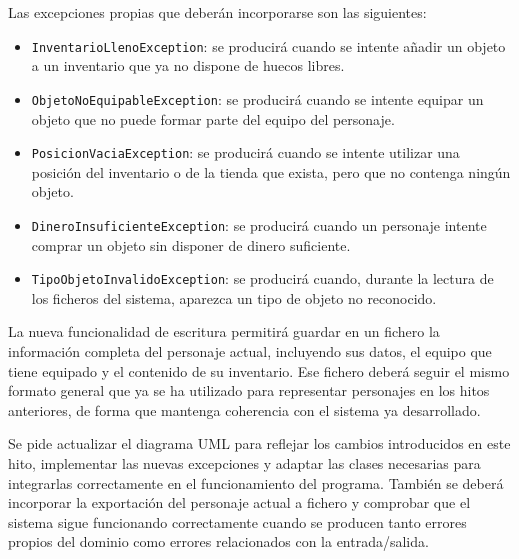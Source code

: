 \documentclass[11pt,a4paper]{article}
\begin{document}
Las excepciones propias que deberán incorporarse son las siguientes:
\begin{itemize}
    \item \texttt{InventarioLlenoException}: se producirá cuando se intente añadir un objeto a un inventario que ya no dispone de huecos libres.
    \item \texttt{ObjetoNoEquipableException}: se producirá cuando se intente equipar un objeto que no puede formar parte del equipo del personaje.
    \item \texttt{PosicionVaciaException}: se producirá cuando se intente utilizar una posición del inventario o de la tienda que exista, pero que no contenga ningún objeto.
    \item \texttt{DineroInsuficienteException}: se producirá cuando un personaje intente comprar un objeto sin disponer de dinero suficiente.
    \item \texttt{TipoObjetoInvalidoException}: se producirá cuando, durante la lectura de los ficheros del sistema, aparezca un tipo de objeto no reconocido.
\end{itemize}

La nueva funcionalidad de escritura permitirá guardar en un fichero la información completa del personaje actual, incluyendo sus datos, el equipo que tiene equipado y el contenido de su inventario. Ese fichero deberá seguir el mismo formato general que ya se ha utilizado para representar personajes en los hitos anteriores, de forma que mantenga coherencia con el sistema ya desarrollado.

Se pide actualizar el diagrama UML para reflejar los cambios introducidos en este hito, implementar las nuevas excepciones y adaptar las clases necesarias para integrarlas correctamente en el funcionamiento del programa. También se deberá incorporar la exportación del personaje actual a fichero y comprobar que el sistema sigue funcionando correctamente cuando se producen tanto errores propios del dominio como errores relacionados con la entrada/salida.
\end{document}
